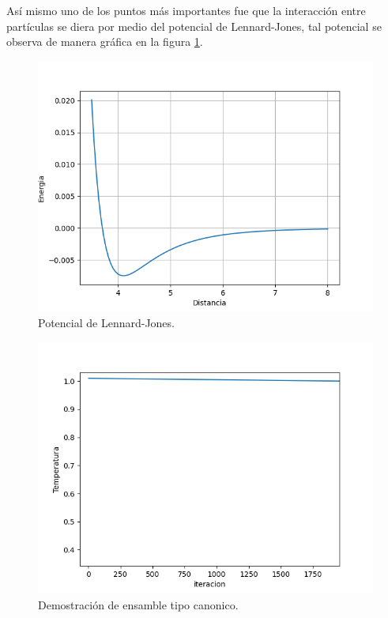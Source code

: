 \documentclass[3pt,twocolumn]{elsarticle}
\begin{document}
Así mismo uno de los puntos más importantes fue que la interacción entre partículas se diera por medio del potencial de Lennard-Jones, tal potencial se observa de manera gráfica en la figura \ref{f3}.

\begin{figure}[h!]
\centering
\includegraphics[width=\linewidth]{Lennard-Jones.png}
\caption{Potencial de Lennard-Jones.}
\label{f3}
\end{figure}

\begin{figure}[h!]
\centering
\includegraphics[width=\linewidth]{canonico itervs temp.png}
\caption{Demostración de ensamble tipo canonico.}
\label{f4}
\end{figure}
\end{document}
